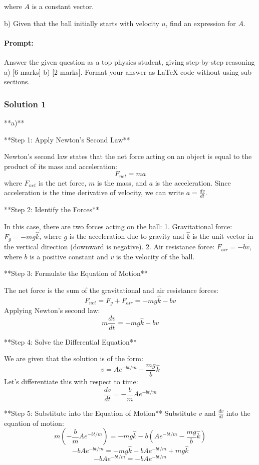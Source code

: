 \documentclass{article}
\begin{document}
where $A$ is a constant vector.

b) Given that the ball initially starts with velocity $u$, find an expression for $A$.

\paragraph{Prompt: \\} 
Answer the given question as a top physics student, giving step-by-step reasoning a) [6 marks] b) [2 marks]. Format your answer as LaTeX code without using sub-sections. 

\subsubsection{Solution 1}
**a)**

**Step 1: Apply Newton's Second Law**

Newton's second law states that the net force acting on an object is equal to the product of its mass and acceleration:
$$F_{net} = ma$$
where $F_{net}$ is the net force, $m$ is the mass, and $a$ is the acceleration.
Since acceleration is the time derivative of velocity, we can write $a = \frac{dv}{dt}$.

**Step 2: Identify the Forces**

In this case, there are two forces acting on the ball:
1.  Gravitational force: $F_g = -mg\hat{k}$, where $g$ is the acceleration due to gravity and $\hat{k}$ is the unit vector in the vertical direction (downward is negative).
2.  Air resistance force: $F_{air} = -bv$, where $b$ is a positive constant and $v$ is the velocity of the ball.

**Step 3: Formulate the Equation of Motion**

The net force is the sum of the gravitational and air resistance forces:
$$F_{net} = F_g + F_{air} = -mg\hat{k} - bv$$
Applying Newton's second law:
$$m\frac{dv}{dt} = -mg\hat{k} - bv$$

**Step 4: Solve the Differential Equation**

We are given that the solution is of the form:
$$v = Ae^{-bt/m} - \frac{mg}{b}\hat{k}$$
Let's differentiate this with respect to time:
$$\frac{dv}{dt} = -\frac{b}{m}Ae^{-bt/m}$$

**Step 5: Substitute into the Equation of Motion**
Substitute $v$ and $\frac{dv}{dt}$ into the equation of motion:
$$m\left(-\frac{b}{m}Ae^{-bt/m}\right) = -mg\hat{k} - b\left(Ae^{-bt/m} - \frac{mg}{b}\hat{k}\right)$$
$$-bAe^{-bt/m} = -mg\hat{k} - bAe^{-bt/m} + mg\hat{k}$$
$$-bAe^{-bt/m} = -bAe^{-bt/m}$$
\end{document}
